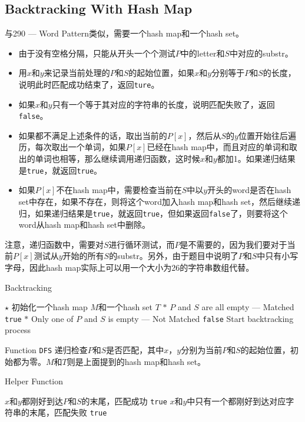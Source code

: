 \subsection{Backtracking With Hash Map}
与290 --- Word Pattern类似，需要一个hash map和一个hash set。
\begin{itemize}
\item 由于没有空格分隔，只能从开头一个个测试$P$中的letter和$S$中对应的substr。
\item 用$x$和$y$来记录当前处理的$P$和$S$的起始位置，如果$x$和$y$分别等于$P$和$S$的长度，说明此时匹配成功结束了，返回\texttt{ture}。
\item 如果$x$和$y$只有一个等于其对应的字符串的长度，说明匹配失败了，返回\texttt{false}。
\item 如果都不满足上述条件的话，取出当前的$P[x]$，然后从$S$的$y$位置开始往后遍历，每次取出一个单词，如果$P[x]$已经在hash map中，而且对应的单词和取出的单词也相等，那么继续调用递归函数，这时候$x$和$y$都加1。如果递归结果是\texttt{true}，就返回\texttt{true}。
\item 如果$P[x]$不在hash map中，需要检查当前在$S$中以$y$开头的word是否在hash set中存在，如果不存在，则将这个word加入hash
 map和hash set，然后继续递归，如果递归结果是\texttt{true}，就返回\texttt{true}，但如果返回\texttt{false}了，则要将这个word从hash map和hash set中删除。
\end{itemize}
注意，递归函数中，需要对$S$进行循环测试，而$P$是不需要的，因为我们要对于当前$P[x]$测试从$y$开始的所有$S$的substr。另外，由于题目中说明了$P$和$S$中只有小写字母，因此hash map实际上可以用一个大小为26的字符串数组代替。
\setcounter{algorithm}{0}
\begin{algorithm}[H]
\caption{Backtracking}
\begin{algorithmic}[1]
\State $\star$ 初始化一个hash map $M$和一个hash set $T$
\State $\ast$ $P$ and $S$ are all empty --- Matched
\State \Return \texttt{true}
\EndIf
\State $\ast$ Only one of $P$ and $S$ is empty --- Not Matched
\State \Return \texttt{false}
\EndIf
\State {} \Comment Start backtracking process
\EndProcedure
\end{algorithmic}
\end{algorithm}
Function \texttt{DFS} 递归检查$P$和$S$是否匹配，其中$x$，$y$分别为当前$P$和$S$的起始位置，初始都为零。$M$和$T$则是上面提到的hash map和hash set。
\begin{algorithm}[H]
\caption{Helper Function}
\begin{algorithmic}[1]
 \Comment $x$和$y$都刚好到达$P$和$S$的末尾，匹配成功
\State \Return \texttt{true}
\EndIf
{} \Comment $x$和$y$中只有一个都刚好到达对应字符串的末尾，匹配失败
\State \Return \texttt{true}
\EndIf
{}
\end{algorithmic}
\end{algorithm}

